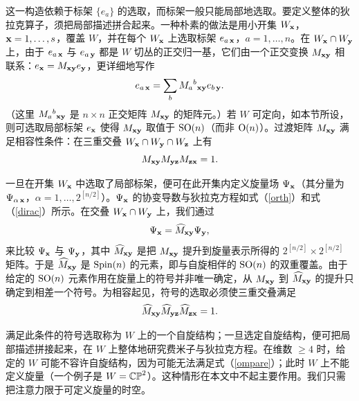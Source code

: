 这一构造依赖于标架 $\{e_a\}$ 的选取，而标架一般只能局部地选取。要定义整体的狄拉克算子，须把局部描述拼合起来。一种朴素的做法是用小开集 $W_\x$，$\x=1,\dots,s$，覆盖 $W$，并在每个 $W_\x$ 上选取标架 $e_{a\,\x}$，$a=1,\dots,n$。在 $W_\x\cap W_\y$ 上，由于 $e_{a\,\x}$ 与 $e_{a\,\y}$ 都是 $W$ 切丛的正交归一基，它们由一个正交变换 $M_{\x \y}$ 相联系：$e_\x=M_{\x \y} e_\y$，更详细地写作
\begin{equation}\label{toroth}e_{a\,\x}=\sum_b M_a{}^b{}_{\x \y} e_{b\,\y}. \end{equation}
（这里 $M_a{}^b{}_{\x \y}$ 是 $n\times n$ 正交矩阵 $M_{\x \y}$ 的矩阵元。）若 $W$ 可定向，如本节所设，则可选取局部标架 $e_\x$ 使得 $M_{\x \y}$ 取值于 $\SO(n)$（而非 $\O(n)$）。过渡矩阵 $M_{\x \y}$ 满足相容性条件：在三重交叠 $W_\x\cap W_\y\cap W_\z$ 上有
\begin{equation}\label{horth} M_{\x \y}M_{\y \z}M_{\z \x}=1.\end{equation}


一旦在开集 $W_\x$ 中选取了局部标架，便可在此开集内定义旋量场 $\Psi_\x$（其分量为 $\Psi_{\alpha \,\x}$，$\alpha=1,\dots, 2^{[n/2]}$）。$\Psi_\x$ 的协变导数与狄拉克方程如式（\ref{orth}）和式（\ref{dirac}）所示。在交叠 $W_\x\cap W_\y$ 上，我们通过
\begin{equation}\label{compare}\Psi_\x =\h M_{\x \y}\Psi_\y,\end{equation}
来比较 $\Psi_\x$ 与 $\Psi_\y$，其中 $\h M_{\x \y}$ 是把 $M_{\x \y}$ 提升到旋量表示所得的 $2^{[n/2]}\times 2^{[n/2]}$ 矩阵。于是 $\h M_{\x \y}$ 是 $\Spin(n)$ 的元素，即与自旋相伴的 $\SO(n)$ 的双重覆盖。由于给定的 $\SO(n)$ 元素作用在旋量上的符号并非唯一确定，从 $M_{\x \y}$ 到 $\h M_{\x \y}$ 的提升只确定到相差一个符号。为相容起见，符号的选取必须使三重交叠满足
\begin{equation}\label{ompare}\h M_{\x \y}\h M_{\y \z}\h M_{\z \x}=1. \end{equation}


满足此条件的符号选取称为 $W$ 上的一个自旋结构；一旦选定自旋结构，便可把局部描述拼接起来，在 $W$ 上整体地研究费米子与狄拉克方程。在维数 $\geq 4$ 时，给定的 $W$ 可能不容许自旋结构，因为可能无法满足式（\ref{ompare}）；此时 $W$ 上不能定义旋量（一个例子是 $W=\Bbb{CP}^2$）。这种情形在本文中不起主要作用。我们只需把注意力限于可定义旋量的时空。

